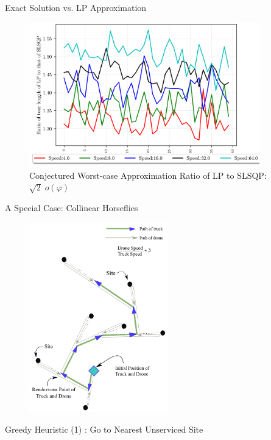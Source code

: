 \documentclass{beamer}
\begin{document}
\begin{frame}{Exact Solution vs. LP Approximation}
  \begin{figure}
        \includegraphics[width=10.0cm]{../img/tour_length_ratios.png}
        \caption*{Conjectured Worst-case Approximation Ratio of LP to SLSQP: {$\sqrt{2} \; o(\varphi) $}}
  \end{figure}
\end{frame}


\begin{frame}{A Special Case: Collinear Horseflies}
  \vspace{-10pt}
 \begin{figure}[H]
    \centering
    \includegraphics[width=6.0cm]{../img/collinear_horseflies.png}
  \end{figure}

\end{frame}

\begin{frame}{Greedy Heuristic (1) : Go to Nearest Unserviced Site }
\end{frame}
\end{document}
